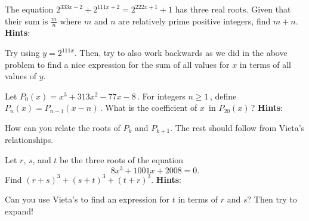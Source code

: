 \documentclass[11pt,titlepage]{scrartcl}
\newenvironment{hint}{\footnotesize \normalfont \textbf{Hints}:}{\hspace{-0.5ex}}
\begin{document}
\begin{exercisebox}
\begin{exercise}\label{howmany}
The equation $2^{333x-2} + 2^{111x+2} = 2^{222x+1} + 1$ has three real roots. Given that their sum is $\frac mn$ where $m$ and $n$ are relatively prime positive integers, find $m+n.$
\begin{hint}
\begin{addhint}{
Try using $y=2^{111x}$. Then, try to also work backwards as we did in the above problem to find a nice expression for the sum of all values for $x$ in terms of all values of $y$.
}\end{addhint}
\end{hint}
\end{exercise}
\begin{exercise}
Let $P_0(x) = x^3 + 313x^2 - 77x - 8\,$. For integers $n \ge 1\,$, define $P_n(x) = P_{n - 1}(x - n)\,$. What is the coefficient of $x\,$ in $P_{20}(x)\,$?
\begin{hint}
\begin{addhint}{
How can you relate the roots of $P_k$ and $P_{k+1}$. The rest should follow from Vieta's relationships.
}\end{addhint}
\end{hint}
\end{exercise}
\begin{exercise}
Let $r$, $s$, and $t$ be the three roots of the equation \[8x^3 + 1001x + 2008 = 0.\] Find $(r + s)^3 + (s + t)^3 + (t + r)^3$.
\begin{hint}
\begin{addhint}{
Can you use Vieta's to find an expression for $t$ in terms of $r$ and $s$? Then try to expand!
}\end{addhint}
\end{hint}
\end{exercise}
\end{exercisebox}
\end{document}
